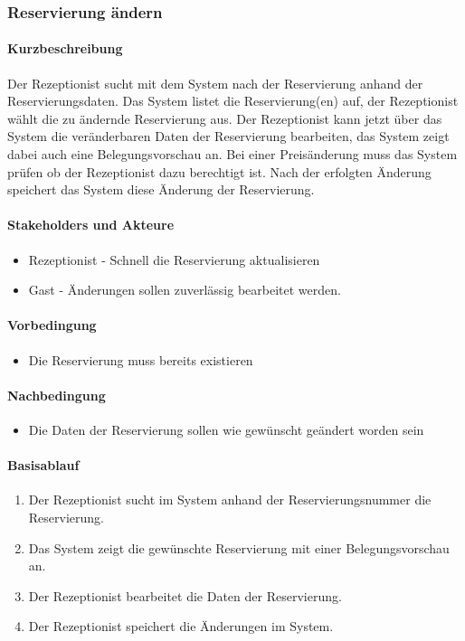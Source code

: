 \subsubsection{Reservierung ändern}

\paragraph{Kurzbeschreibung}
Der \Gls{Rezeptionist} sucht mit dem System nach der \Gls{Reservierung} anhand der Reservierungsdaten. Das System listet die \Gls{Reservierung}(en) auf,  der \Gls{Rezeptionist} wählt die zu ändernde \Gls{Reservierung} aus. Der \Gls{Rezeptionist} kann jetzt über das System die veränderbaren Daten der \Gls{Reservierung} bearbeiten, das System zeigt dabei auch eine \Gls{Belegungsvorschau} an. Bei einer Preisänderung muss das System prüfen ob der \Gls{Rezeptionist} dazu berechtigt ist. Nach der erfolgten Änderung speichert das System diese Änderung der \Gls{Reservierung}.

\paragraph{Stakeholders und Akteure}
\begin{itemize}
	\item \Gls{Rezeptionist} - Schnell die \Gls{Reservierung} aktualisieren
	\item \Gls{Gast} - Änderungen sollen zuverlässig bearbeitet werden.
\end{itemize}

\paragraph{Vorbedingung}
\begin{itemize}
	\item Die \Gls{Reservierung} muss bereits existieren
\end{itemize}

\paragraph{Nachbedingung}
\begin{itemize}
	\item Die Daten der \Gls{Reservierung} sollen wie gewünscht geändert worden sein
\end{itemize}

\paragraph{Basisablauf}
\begin{enumerate}
	\item Der \Gls{Rezeptionist} sucht im System anhand der \Gls{Reservierungsnummer} die \Gls{Reservierung}.
	\item Das System zeigt die gewünschte \Gls{Reservierung} mit einer \Gls{Belegungsvorschau} an.
	\item Der \Gls{Rezeptionist} bearbeitet die Daten der \Gls{Reservierung}.
	\item Der \Gls{Rezeptionist} speichert die Änderungen im System.
\end{enumerate}

